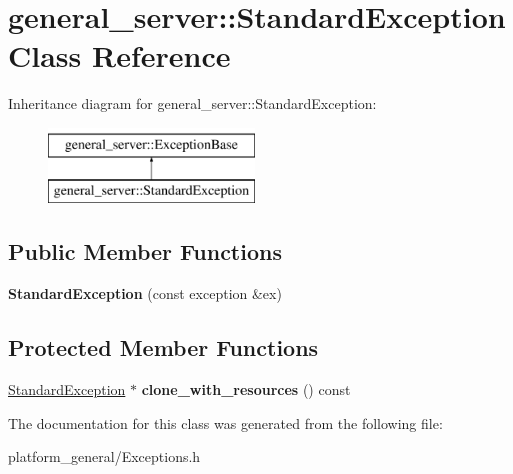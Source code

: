 \hypertarget{classgeneral__server_1_1StandardException}{\section{general\-\_\-server\-:\-:\-Standard\-Exception \-Class \-Reference}
\label{classgeneral__server_1_1StandardException}
}
\-Inheritance diagram for general\-\_\-server\-:\-:\-Standard\-Exception\-:\begin{figure}[H]
\begin{center}
\leavevmode
\includegraphics[height=2.000000cm]{classgeneral__server_1_1StandardException}
\end{center}
\end{figure}
\subsection*{\-Public \-Member \-Functions}
\begin{DoxyCompactItemize}
\item 
\hypertarget{classgeneral__server_1_1StandardException_a37a204bb7ae29805a0ee8bd4112c99dd}{{\bfseries \-Standard\-Exception} (const exception \&ex)}\label{classgeneral__server_1_1StandardException_a37a204bb7ae29805a0ee8bd4112c99dd}

\end{DoxyCompactItemize}
\subsection*{\-Protected \-Member \-Functions}
\begin{DoxyCompactItemize}
\item 
\hypertarget{classgeneral__server_1_1StandardException_ac512e14a2335dfb853c76b54cf707011}{\hyperlink{classgeneral__server_1_1StandardException}{\-Standard\-Exception} $\ast$ {\bfseries clone\-\_\-with\-\_\-resources} () const }\label{classgeneral__server_1_1StandardException_ac512e14a2335dfb853c76b54cf707011}

\end{DoxyCompactItemize}


\-The documentation for this class was generated from the following file\-:\begin{DoxyCompactItemize}
\item 
platform\-\_\-general/\-Exceptions.\-h\end{DoxyCompactItemize}
